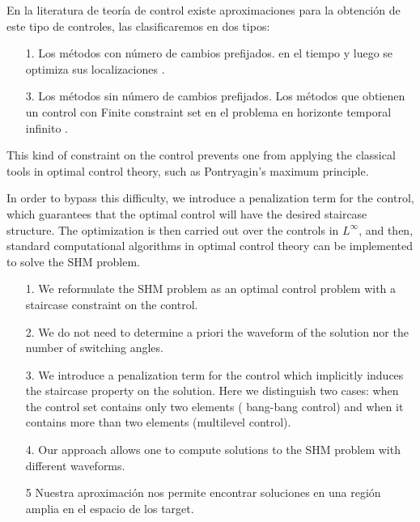\documentclass[twocolumn]{autart}    %
\begin{document}
En la literatura de teoría de control existe aproximaciones para la obtención de este tipo de controles, las clasificaremos en dos tipos:
\begin{enumerate}
	\item [1.]Los métodos con  número de cambios prefijados. en el tiempo y luego se optimiza sus localizaciones \cite{Xu2002}.
	\item [3.]Los métodos sin  número de cambios prefijados. Los métodos que obtienen un control con  Finite  constraint  set en el problema en horizonte temporal infinito \cite{Quevedo2004}.
\end{enumerate} 
 This kind of constraint on the control prevents one from applying the classical tools in optimal control theory, such as Pontryagin's maximum principle.

In order to bypass this difficulty, we introduce a penalization term for the control, which guarantees that the optimal control will have the desired staircase structure. The optimization is then carried out over the controls in $L^\infty$, and then, standard computational algorithms in optimal control theory can be implemented to solve the SHM problem. 

\begin{enumerate}
    \item[1.] We reformulate the SHM problem as an optimal control problem with a staircase constraint on the control.
	\item[2.] We do not need to determine a priori the waveform of the solution nor the number of switching angles.  
    \item[3.] We introduce a penalization term for the control which implicitly induces the staircase property on the solution. Here we distinguish two cases: when the control set contains only two elements ( bang-bang control) and when it contains more than two elements (multilevel control).
    \item[4.] Our approach allows one to compute solutions to the SHM problem with different waveforms.
    \JOStart
    \item[5 ] Nuestra aproximación nos permite encontrar soluciones en una región amplia en el espacio de los target.
\end{enumerate}
\end{document}
